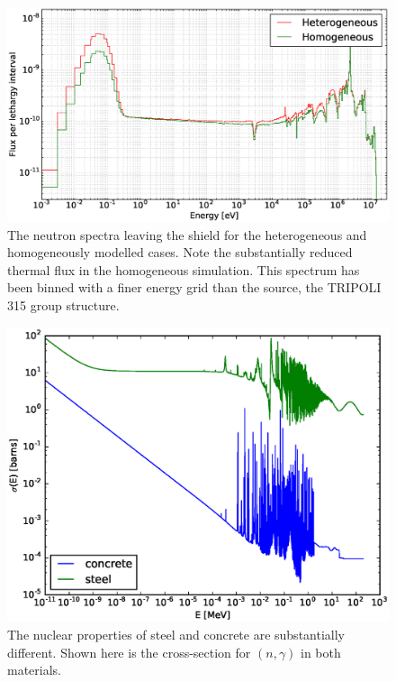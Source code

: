 \begin{figure}[H]
	\includegraphics[width=\textwidth]{transmitted_neutron_spectra}
	\caption{The neutron spectra leaving the shield for the heterogeneous and homogeneously modelled cases. Note the substantially reduced thermal flux in the homogeneous simulation. This spectrum has been binned with a finer energy grid than the source, the TRIPOLI 315 group structure.}
	\label{fig:trans_neutron_spec}
\end{figure}

\begin{figure}[H]
  \includegraphics[width=\textwidth]{n_rad_capture}
  \caption{The nuclear properties of steel and concrete are substantially different. Shown here is the cross-section for $(n,\gamma)$ in both materials.}
  \label{fig:n_rad_capture}
\end{figure}

